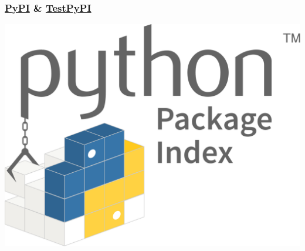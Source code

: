 \begin{frame}
    \frametitle{\href{https://pypi.org/}{PyPI} \& \href{https://test.pypi.org/}{TestPyPI}}
    \centering

    \includegraphics[scale=0.1]{Bin/pypi_logo.png}
\end{frame}
